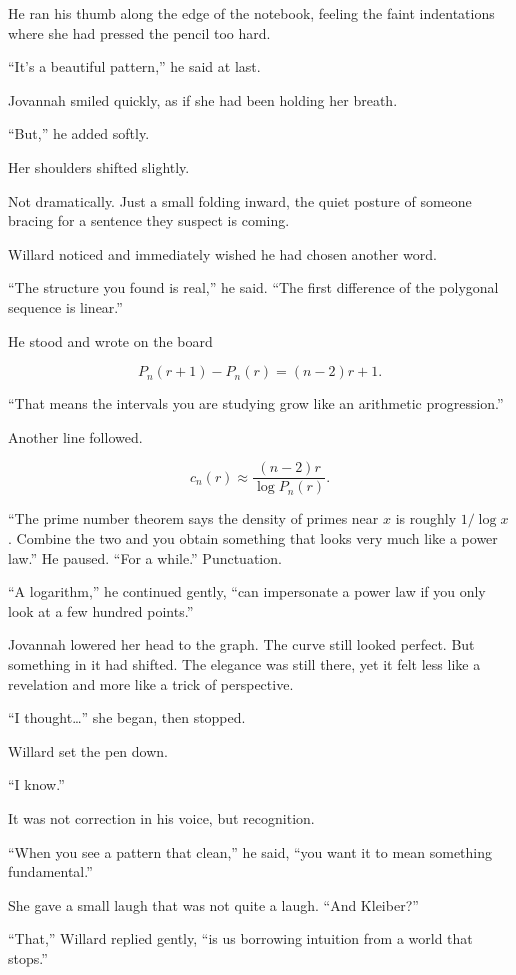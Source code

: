 He ran his thumb along the edge of the notebook, feeling the faint indentations where she had pressed the pencil too hard.

``It's a beautiful pattern,'' he said at last.

Jovannah smiled quickly, as if she had been holding her breath.

``But,'' he added softly.

Her shoulders shifted slightly.

Not dramatically. Just a small folding inward, the quiet posture of someone bracing for a sentence they suspect is coming.

Willard noticed and immediately wished he had chosen another word.

``The structure you found is real,'' he said. ``The first difference of the polygonal sequence is linear.''

He stood and wrote on the board

\[
P_n(r+1)-P_n(r)=(n-2)r+1 .
\]

``That means the intervals you are studying grow like an arithmetic progression.''

Another line followed.

\[
c_n(r) \approx \frac{(n-2)r}{\log P_n(r)} .
\]

``The prime number theorem says the density of primes near $x$ is roughly $1/\log x$. Combine the two and you obtain something that looks very much like a power law.'' He paused. ``For a while.'' Punctuation.

``A logarithm,'' he continued gently, ``can impersonate a power law if you only look at a few hundred points.''

Jovannah lowered her head to the graph. The curve still looked perfect. But something in it had shifted. The elegance was still there, yet it felt less like a revelation and more like a trick of perspective.

``I thought\dots'' she began, then stopped.

Willard set the pen down.

``I know.''

It was not correction in his voice, but recognition.

``When you see a pattern that clean,'' he said, ``you want it to mean something fundamental.''

She gave a small laugh that was not quite a laugh. ``And Kleiber?''

``That,'' Willard replied gently, ``is us borrowing intuition from a world that stops.''


